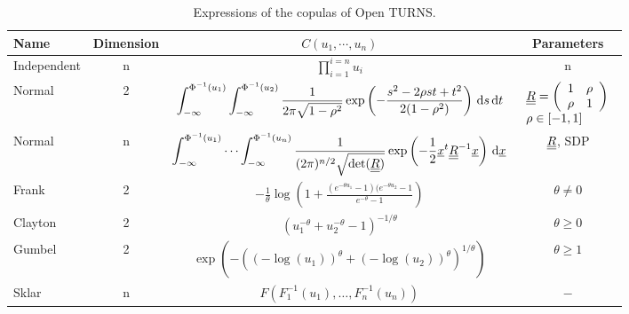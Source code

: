 \newcommand\B{\rule[-2.4ex]{0pt}{0pt}}

\begin{table}[H]
  \begin{center}
    \begin{tabular}{|l|c|c|c|}
      \hline
      Name & Dimension & $C(u_1, \cdots, u_n)$ & Parameters\textspace\B\\
      \hline
      Independent & n& $\displaystyle \prod_{i=1}^{i=n} u_i$ & n \textspace\B\\
      \hline
      Normal & 2 &  $\displaystyle\int_{-\infty}^{\Phi^{-1}(u_1)}\int_{-\infty}^{\Phi^{-1}(u_2)}\frac{1}{2\pi\sqrt{1-\rho^2}}\exp\left(-\frac{s^2-2\rho st+t^2}{2(1-\rho^2)}\right)\,{\mathrm{d}} s\,{\mathrm{d}} t$ \mathspace\B & $\begin{array}{l}
        {\underline{\underline{R}}} = \left(\begin{array}{cc}
            1 & \rho \\
            \rho & 1
          \end{array}
        \right)\\
        \rho \in [-1,1]
      \end{array}$\\
      \hline
      Normal & n & $\displaystyle\int_{-\infty}^{\Phi^{-1}(u_1)}\cdots \int_{-\infty}^{\Phi^{-1}(u_n)}\frac{1}{(2\pi)^{n/2} \sqrt{\det({\underline{\underline{R}}})}}\exp\left(-\frac{1}{2}{\underline{x}}^t {\underline{\underline{R}}}^{-1} {\underline{x}} \right)\,{\mathrm{d}} {\underline{x}}$ & ${\underline{\underline{R}}}$, SDP \textspace\B\\
      \hline
      Frank & 2 & $\displaystyle -\frac{1}{\theta}\log\left(1+\frac{(e^{-\theta u_1}-1)(e^{-\theta u_2}-1}{e^{-\theta}-1}\right)$ & $\theta \neq 0$\textspace\B\\
      \hline
      Clayton & 2 & $\displaystyle \left(u_1^{-\theta}+u_2^{-\theta}-1\right)^{-1/\theta}$ & $\theta \geq 0$\textspace\B\\
      \hline
      Gumbel & 2 & $\displaystyle \exp\left(-\left((-\log(u_1))^{\theta}+(-\log(u_2))^{\theta}\right)^{1/\theta}\right)$ & $\theta \geq 1$\textspace\B\\
      \hline
      Sklar & n & $\displaystyle F(F_1^{-1}(u_1), \dots, F_n^{-1}(u_n))$ & $-$\textspace\B\\
      \hline
    \end{tabular}
    \caption{Expressions of the copulas of Open TURNS.}
    \label{ListCopulas}
  \end{center}
\end{table}
\textspace\\



